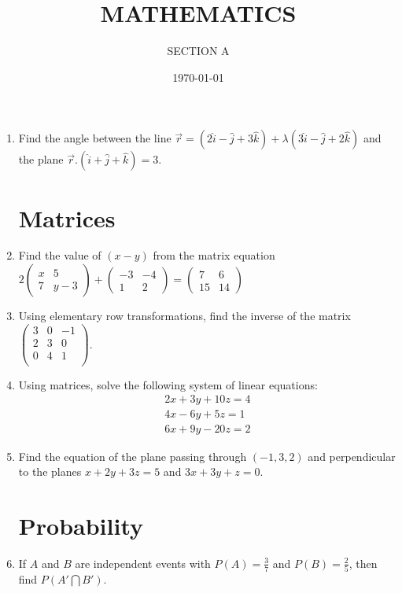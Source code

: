 \documentclass[10pt,-letter paper]{article}
\title{MATHEMATICS}
\author{SECTION A}
\date{\today}
\providecommand{\brak}[1]{\ensuremath{\left(#1\right)}}
\newcommand{\myvec}[1]{\ensuremath{\begin{pmatrix}#1\end{pmatrix}}}
\begin{document}
     \maketitle

     \begin{enumerate}
     \section{Vectors}
    \item Find the angle between the line $\overrightarrow{r}=\brak{2\hat{i}-\hat{j}+3\hat{k}}+\lambda\brak{3\hat{i}-\hat{j}+2\hat{k}}$ and the plane $\overrightarrow{r}.\brak{\hat{i}+\hat{j}+\hat{k}}=3$.

     \section{Matrices}

     \item Find the value of $\brak{x-y}$ from the matrix equation $2\myvec{x & 5 \\ 7 & y-3} + \myvec{-3 & -4 \\ 1 & 2}= \myvec{7 & 6 \\ 15 & 14}$

     \item Using elementary row transformations, find the inverse of the matrix $\myvec{3 & 0 & -1\\
	2 & 3 & 0\\
	0 & 4 & 1\\}$.

 \item Using matrices, solve the following system of linear equations:
	\begin{align*}
		2x+3y+10z=4\\
		4x-6y+5z=1\\
		6x+9y-20z=2
	\end{align*}

      \item Find the equation of the plane passing through $\brak{-1,3,2}$ and perpendicular to the planes $x+2y+3z=5$ and $3x+3y+z=0$.
      
     \section{Probability}
     
     \item If $A$ and $B$ are independent events with $P\brak{A}=\frac{3}{7}$ and $P\brak{B}=\frac{2}{5}$, then find $P\brak{A'\bigcap B'}$.


\end{enumerate}
\end{document}
